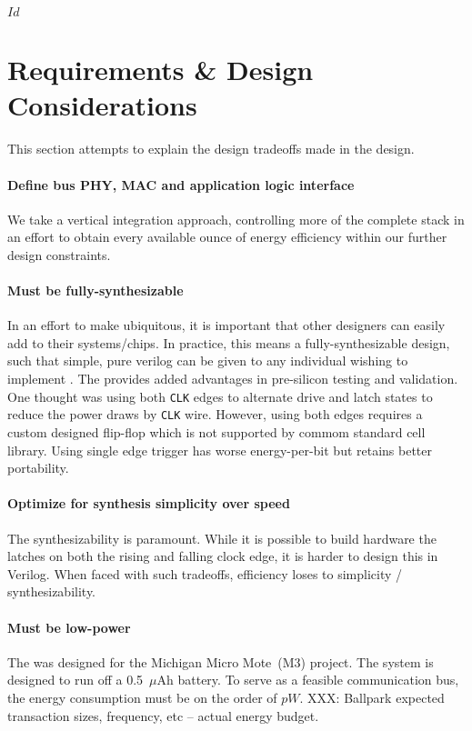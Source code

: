 \svnInfo $Id$

\section{Requirements \& Design Considerations}
\label{sec:requirements}
\label{sec:design}
This section attempts to explain the design tradeoffs made in the \bus design.

\paragraph{Define bus PHY, MAC and application logic interface}
We take a vertical integration approach, controlling more of the complete
stack in an effort to obtain every available ounce of energy efficiency within
our further design constraints.

\paragraph{Must be fully-synthesizable}
In an effort to make \bus ubiquitous, it is important that other designers can
easily add \bus to their systems/chips. In practice, this means a
fully-synthesizable design, such that simple, pure verilog can be given to any
individual wishing to implement \bus. The provides added advantages in
pre-silicon testing and validation. One thought was using both {\tt CLK} edges
to alternate {\sc drive} and {\sc latch} states to reduce the power draws by
{\tt CLK} wire. However, using both edges requires a custom designed flip-flop
which is not supported by commom standard cell library. Using single edge 
trigger has worse energy-per-bit but retains better portability.

\paragraph{Optimize for synthesis simplicity over speed}
The synthesizability is paramount. While it is possible to build hardware the
latches on both the rising and falling clock edge, it is harder to design this
in Verilog. When faced with such tradeoffs, efficiency loses to simplicity /
synthesizability.

\paragraph{Must be low-power}
The \bus was designed for the Michigan Micro Mote~(M3) project. The system is
designed to run off a 0.5~$\mu$Ah battery. To serve as a feasible
communication bus, the energy consumption must be on the order of $pW$. XXX:
Ballpark expected transaction sizes, frequency, etc -- actual energy budget.

